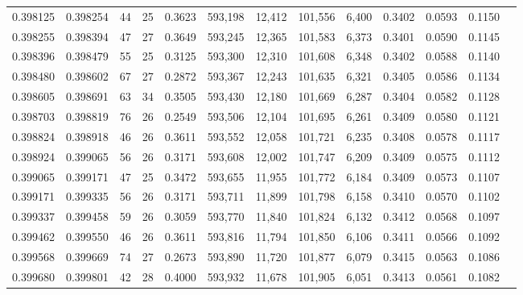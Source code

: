 \begin{tabular}{rrrrrrrrrrrrr}
0.398125 & 0.398254 &    44 &  25 &                                     0.3623 & 593,198 &  12,412 & 101,556 &   6,400 & 0.3402 & 0.0593 & 0.1150 \\
0.398255 & 0.398394 &    47 &  27 &                                     0.3649 & 593,245 &  12,365 & 101,583 &   6,373 & 0.3401 & 0.0590 & 0.1145 \\
0.398396 & 0.398479 &    55 &  25 &                                     0.3125 & 593,300 &  12,310 & 101,608 &   6,348 & 0.3402 & 0.0588 & 0.1140 \\
0.398480 & 0.398602 &    67 &  27 &                                     0.2872 & 593,367 &  12,243 & 101,635 &   6,321 & 0.3405 & 0.0586 & 0.1134 \\
0.398605 & 0.398691 &    63 &  34 &                                     0.3505 & 593,430 &  12,180 & 101,669 &   6,287 & 0.3404 & 0.0582 & 0.1128 \\
0.398703 & 0.398819 &    76 &  26 &                                     0.2549 & 593,506 &  12,104 & 101,695 &   6,261 & 0.3409 & 0.0580 & 0.1121 \\
0.398824 & 0.398918 &    46 &  26 &                                     0.3611 & 593,552 &  12,058 & 101,721 &   6,235 & 0.3408 & 0.0578 & 0.1117 \\
0.398924 & 0.399065 &    56 &  26 &                                     0.3171 & 593,608 &  12,002 & 101,747 &   6,209 & 0.3409 & 0.0575 & 0.1112 \\
0.399065 & 0.399171 &    47 &  25 &                                     0.3472 & 593,655 &  11,955 & 101,772 &   6,184 & 0.3409 & 0.0573 & 0.1107 \\
0.399171 & 0.399335 &    56 &  26 &                                     0.3171 & 593,711 &  11,899 & 101,798 &   6,158 & 0.3410 & 0.0570 & 0.1102 \\
0.399337 & 0.399458 &    59 &  26 &                                     0.3059 & 593,770 &  11,840 & 101,824 &   6,132 & 0.3412 & 0.0568 & 0.1097 \\
0.399462 & 0.399550 &    46 &  26 &                                     0.3611 & 593,816 &  11,794 & 101,850 &   6,106 & 0.3411 & 0.0566 & 0.1092 \\
0.399568 & 0.399669 &    74 &  27 &                                     0.2673 & 593,890 &  11,720 & 101,877 &   6,079 & 0.3415 & 0.0563 & 0.1086 \\
0.399680 & 0.399801 &    42 &  28 &                                     0.4000 & 593,932 &  11,678 & 101,905 &   6,051 & 0.3413 & 0.0561 & 0.1082 \\

\end{tabular}
